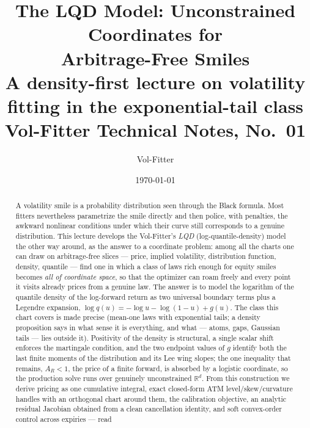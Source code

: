 \documentclass[11pt]{article}
\title{\textbf{The LQD Model: Unconstrained Coordinates for\\
Arbitrage-Free Smiles}\\[2pt]
\large A density-first lecture on volatility fitting in the
exponential-tail class\\[2pt]
\normalsize Vol-Fitter Technical Notes, No.~01}
\author{Vol-Fitter}
\date{\today}
\begin{document}
\maketitle







\begin{abstract}
A volatility smile is a probability distribution seen through the Black
formula.  Most fitters nevertheless parametrize the smile directly and then
police, with penalties, the awkward nonlinear conditions under which their
curve still corresponds to a genuine distribution.  This lecture develops the
Vol-Fitter's \emph{LQD} (log-quantile-density) model the other way around, as
the answer to a coordinate problem: among all the charts one can draw on
arbitrage-free slices --- price, implied volatility, distribution
function, density, quantile --- find one in which a class of laws rich
enough for equity smiles becomes \emph{all of coordinate space}, so that the
optimizer can roam freely and every point it visits already prices from a
genuine law.  The answer is to
model the logarithm of the quantile density of the log-forward return as two
universal boundary terms plus a Legendre expansion,
$\log q(u) = -\log u - \log(1-u) + g(u)$.  The class this chart covers is
made precise (mean-one laws with exponential tails; a density proposition
says in what sense it is everything, and what --- atoms, gaps,
Gaussian tails --- lies outside it).  Positivity of the density is
structural, a single scalar shift enforces the martingale condition, and the
two endpoint values of $g$ identify both the last finite moments of the
distribution and its Lee wing slopes; the one inequality that remains,
$A_R<1$, the price of a finite forward, is absorbed by a logistic
coordinate, so the production solve runs over genuinely unconstrained
$\mathbb{R}^d$.  From this
construction we derive pricing as one cumulative integral, exact closed-form
ATM level/skew/curvature handles with an orthogonal chart around them, the
calibration objective, an analytic residual Jacobian obtained from a clean
cancellation identity, and soft convex-order control across expiries --- read

\end{abstract}
\end{document}
